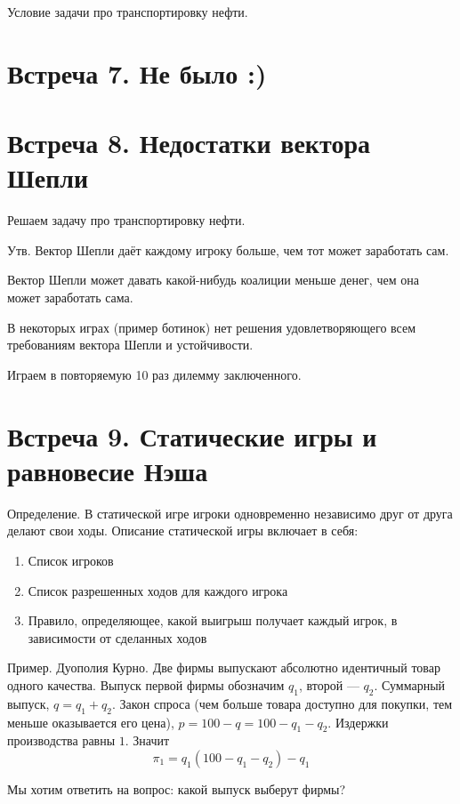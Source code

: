 \documentclass[pdftex,12pt,a4paper]{article}
\begin{document}
Условие задачи про транспортировку нефти.

\section{Встреча 7. Не было :)}




\section{Встреча 8. Недостатки вектора Шепли}



Решаем задачу про транспортировку нефти. 


Утв. Вектор Шепли даёт каждому игроку больше, чем тот может заработать сам.


Вектор Шепли может давать какой-нибудь коалиции меньше денег, чем она может заработать сама.


В некоторых играх (пример ботинок) нет решения удовлетворяющего всем требованиям вектора Шепли и устойчивости.


Играем в повторяемую 10 раз дилемму заключенного. 


\section{Встреча 9. Статические игры и равновесие Нэша }


Определение. В статической игре игроки одновременно независимо друг от друга делают свои ходы. Описание статической игры включает в себя:
\begin{enumerate}
\item Список игроков
\item Список разрешенных ходов для каждого игрока
\item Правило, определяющее, какой выигрыш получает каждый игрок, в зависимости от сделанных ходов
\end{enumerate}


Пример. Дуополия Курно. Две фирмы выпускают абсолютно идентичный товар одного качества. Выпуск первой фирмы обозначим $q_1$, второй --- $q_2$. Суммарный выпуск, $q=q_1+q_2$. Закон спроса (чем больше товара доступно для покупки, тем меньше оказывается его цена), $p=100-q=100-q_1-q_2$. Издержки производства равны $1$. Значит
\begin{equation}
\pi_1=q_1(100-q_1-q_2)-q_1
\end{equation}

Мы хотим ответить на вопрос: какой выпуск выберут фирмы?
\end{document}
